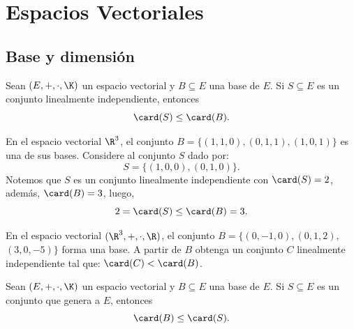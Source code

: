 \documentclass[compacto,10pt]{pubciencias-notas}
\begin{document}

\setcounter{section}{3}
\section{Espacios Vectoriales}
\setcounter{subsection}{6}
\subsection{Base y dimensión}

\begin{prop}
Sean $(E,+,\cdot,\K)$ un espacio vectorial y $B\subseteq E$ una base de $E$. Si $S\subseteq E$ es un conjunto linealmente independiente, entonces
    \[
        \card(S)\leq \card(B).
    \]
\end{prop}

\begin{ejem}\hspace{0pt} 
En el espacio vectorial $\R^{3}$, el conjunto $B = \{(1, 1, 0),(0, 1, 1),(1, 0, 1)\}$ es una de sus bases. Considere al conjunto $S$ dado por:
\[
    S= \{(1, 0, 0),(0, 1, 0)\}.
\]
Notemos que $S$ es un conjunto linealmente independiente con $\card(S) = 2$, además, $\card(B) = 3$, luego, 
\[
2=\card(S)\leq \card(B)=3.
\]
\end{ejem}

\begin{ejer}\hspace{0pt}
En el espacio vectorial $(\R^{3},+,\cdot,\R)$, el conjunto $B=\lbrace(0,-1,0), (0,1,2),$ $(3,0,-5)\rbrace$ forma una base. A partir de $B$ obtenga un conjunto $C$ linealmente independiente tal que: $\card(C) < \card(B)$.
\end{ejer}


\begin{prop}
    Sean $(E,+,\cdot,\K)$ un espacio vectorial y $B\subseteq E$ una base de $E$. Si $S\subseteq E$ es un conjunto que genera a $E$, entonces 
    \[
        \card(B)\leq \card(S).
    \]
\end{prop}
\end{document}
